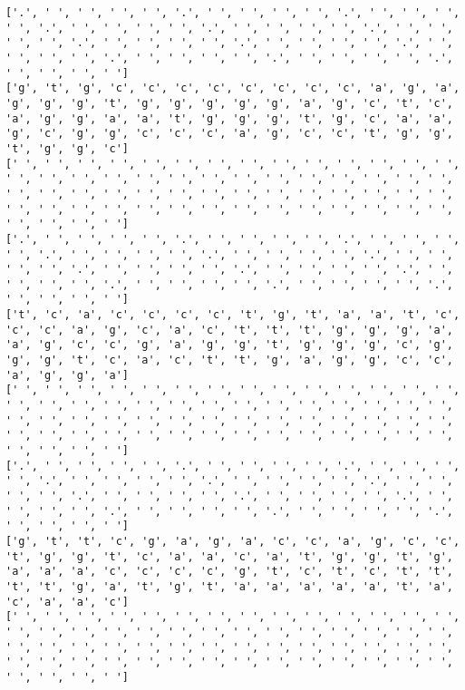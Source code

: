 \documentclass{article}
\begin{document}
\begin{Verbatim}
['.', ' ', ' ', ' ', ' ', '.', ' ', ' ', ' ', ' ', '.', ' ', ' ', ' ', ' ', '.', ' ', ' ', ' ', ' ', '.', ' ', ' ', ' ', ' ', '.', ' ', ' ', ' ', ' ', '.', ' ', ' ', ' ', ' ', '.', ' ', ' ', ' ', ' ', '.', ' ', ' ', ' ', ' ', '.', ' ', ' ', ' ', ' ', '.', ' ', ' ', ' ', ' ', '.', ' ', ' ', ' ', ' ']
['g', 't', 'g', 'c', 'c', 'c', 'c', 'c', 'c', 'c', 'c', 'a', 'g', 'a', 'g', 'g', 'g', 't', 'g', 'g', 'g', 'g', 'g', 'a', 'g', 'c', 't', 'c', 'a', 'g', 'g', 'a', 'a', 't', 'g', 'g', 'g', 't', 'g', 'c', 'a', 'a', 'g', 'c', 'g', 'g', 'c', 'c', 'c', 'a', 'g', 'c', 'c', 't', 'g', 'g', 't', 'g', 'g', 'c']
[' ', ' ', ' ', ' ', ' ', ' ', ' ', ' ', ' ', ' ', ' ', ' ', ' ', ' ', ' ', ' ', ' ', ' ', ' ', ' ', ' ', ' ', ' ', ' ', ' ', ' ', ' ', ' ', ' ', ' ', ' ', ' ', ' ', ' ', ' ', ' ', ' ', ' ', ' ', ' ', ' ', ' ', ' ', ' ', ' ', ' ', ' ', ' ', ' ', ' ', ' ', ' ', ' ', ' ', ' ', ' ', ' ', ' ', ' ', ' ']
['.', ' ', ' ', ' ', ' ', '.', ' ', ' ', ' ', ' ', '.', ' ', ' ', ' ', ' ', '.', ' ', ' ', ' ', ' ', '.', ' ', ' ', ' ', ' ', '.', ' ', ' ', ' ', ' ', '.', ' ', ' ', ' ', ' ', '.', ' ', ' ', ' ', ' ', '.', ' ', ' ', ' ', ' ', '.', ' ', ' ', ' ', ' ', '.', ' ', ' ', ' ', ' ', '.', ' ', ' ', ' ', ' ']
['t', 'c', 'a', 'c', 'c', 'c', 'c', 't', 'g', 't', 'a', 'a', 't', 'c', 'c', 'c', 'a', 'g', 'c', 'a', 'c', 't', 't', 't', 'g', 'g', 'g', 'a', 'a', 'g', 'c', 'c', 'g', 'a', 'g', 'g', 't', 'g', 'g', 'g', 'c', 'g', 'g', 'g', 't', 'c', 'a', 'c', 't', 't', 'g', 'a', 'g', 'g', 'c', 'c', 'a', 'g', 'g', 'a']
[' ', ' ', ' ', ' ', ' ', ' ', ' ', ' ', ' ', ' ', ' ', ' ', ' ', ' ', ' ', ' ', ' ', ' ', ' ', ' ', ' ', ' ', ' ', ' ', ' ', ' ', ' ', ' ', ' ', ' ', ' ', ' ', ' ', ' ', ' ', ' ', ' ', ' ', ' ', ' ', ' ', ' ', ' ', ' ', ' ', ' ', ' ', ' ', ' ', ' ', ' ', ' ', ' ', ' ', ' ', ' ', ' ', ' ', ' ', ' ']
['.', ' ', ' ', ' ', ' ', '.', ' ', ' ', ' ', ' ', '.', ' ', ' ', ' ', ' ', '.', ' ', ' ', ' ', ' ', '.', ' ', ' ', ' ', ' ', '.', ' ', ' ', ' ', ' ', '.', ' ', ' ', ' ', ' ', '.', ' ', ' ', ' ', ' ', '.', ' ', ' ', ' ', ' ', '.', ' ', ' ', ' ', ' ', '.', ' ', ' ', ' ', ' ', '.', ' ', ' ', ' ', ' ']
['g', 't', 't', 'c', 'g', 'a', 'g', 'a', 'c', 'c', 'a', 'g', 'c', 'c', 't', 'g', 'g', 't', 'c', 'a', 'a', 'c', 'a', 't', 'g', 'g', 't', 'g', 'a', 'a', 'a', 'c', 'c', 'c', 'c', 'g', 't', 'c', 't', 'c', 't', 't', 't', 't', 'g', 'a', 't', 'g', 't', 'a', 'a', 'a', 'a', 'a', 't', 'a', 'c', 'a', 'a', 'c']
[' ', ' ', ' ', ' ', ' ', ' ', ' ', ' ', ' ', ' ', ' ', ' ', ' ', ' ', ' ', ' ', ' ', ' ', ' ', ' ', ' ', ' ', ' ', ' ', ' ', ' ', ' ', ' ', ' ', ' ', ' ', ' ', ' ', ' ', ' ', ' ', ' ', ' ', ' ', ' ', ' ', ' ', ' ', ' ', ' ', ' ', ' ', ' ', ' ', ' ', ' ', ' ', ' ', ' ', ' ', ' ', ' ', ' ', ' ', ' ']

\end{Verbatim}
\end{document}
